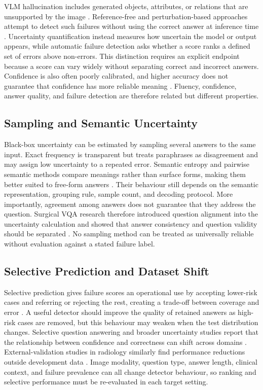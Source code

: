 VLM hallucination includes generated objects, attributes, or relations that are unsupported by the image \citep{liu2024hallucinationsurvey}. Reference-free and perturbation-based approaches attempt to detect such failures without using the correct answer at inference time \citep{li2024referencefree,zhang2024vluncertainty}. Uncertainty quantification instead measures how uncertain the model or output appears, while automatic failure detection asks whether a score ranks a defined set of errors above non-errors. This distinction requires an explicit endpoint because a score can vary widely without separating correct and incorrect answers. Confidence is also often poorly calibrated, and higher accuracy does not guarantee that confidence has more reliable meaning \citep{guo2017calibration,jiang2021whenknow}. Fluency, confidence, answer quality, and failure detection are therefore related but different properties.

\subsection{Sampling and Semantic Uncertainty}

Black-box uncertainty can be estimated by sampling several answers to the same input. Exact frequency is transparent but treats paraphrases as disagreement and may assign low uncertainty to a repeated error. Semantic entropy and pairwise semantic methods compare meanings rather than surface forms, making them better suited to free-form answers \citep{farquhar2024semanticentropy,nguyen2025pairwisesemantic}. Their behaviour still depends on the semantic representation, grouping rule, sample count, and decoding protocol. More importantly, agreement among answers does not guarantee that they address the question. Surgical VQA research therefore introduced question alignment into the uncertainty calculation and showed that answer consistency and question validity should be separated \citep{carlini2026qasnne}. No sampling method can be treated as universally reliable without evaluation against a stated failure label.

\subsection{Selective Prediction and Dataset Shift}

Selective prediction gives failure scores an operational use by accepting lower-risk cases and referring or rejecting the rest, creating a trade-off between coverage and error \citep{geifman2017selective}. A useful detector should improve the quality of retained answers as high-risk cases are removed, but this behaviour may weaken when the test distribution changes. Selective question answering and broader uncertainty studies report that the relationship between confidence and correctness can shift across domains \citep{kamath2020selectiveqa,ovadia2019uncertainty}. External-validation studies in radiology similarly find performance reductions outside development data \citep{yu2022externalvalidation}. Image modality, question type, answer length, clinical context, and failure prevalence can all change detector behaviour, so ranking and selective performance must be re-evaluated in each target setting.

